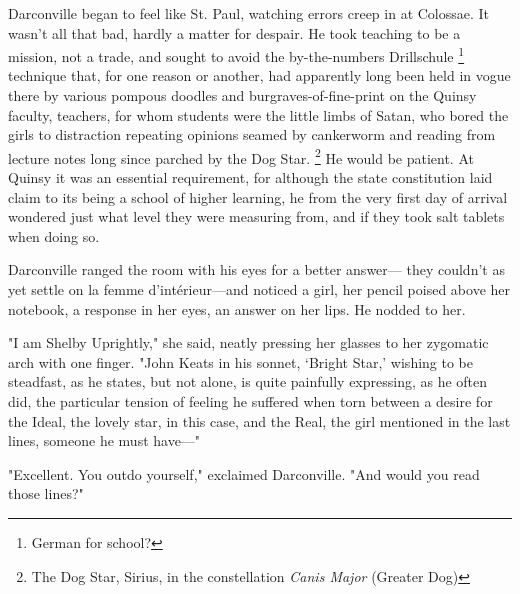  Darconville began to feel like St. Paul, watching errors creep in at Colossae.
It wasn't all that bad, hardly a matter for despair. He took teaching to be a
mission, not a trade, and sought to avoid the by-the-numbers Drillschule
\footnote{ \textdbend German for school?}
technique that, for one reason or another, had apparently long been held in
vogue there by various pompous 
doodles 
and burgraves-of-fine-print 
on the Quinsy faculty, teachers, for whom students were the little limbs of 
Satan, who bored the girls to distraction repeating opinions seamed by 
cankerworm 
and reading from lecture notes long since parched 
by the Dog Star. 
\footnote{The Dog Star, Sirius, in the constellation \textit{Canis Major}
   (Greater Dog)}
He would be patient. At Quinsy it was an essential requirement, for although 
the state constitution laid claim to its being a school of higher learning, 
he from the very first day of arrival wondered just what level they were 
measuring from, and if they took salt tablets when doing so.

  Darconville ranged the room with his eyes for a better answer--- they couldn't
as yet settle on la femme d'intérieur---and noticed a girl, her pencil poised
above her notebook, a response in her eyes, an answer on her lips. He nodded to
her.

  "I am Shelby Uprightly," she said, neatly pressing her glasses to her
zygomatic 
arch with one finger. "John Keats in his sonnet, `Bright Star,'
wishing to be steadfast, as he states, but not alone, is quite painfully
expressing, as he often did, the particular tension of feeling he suffered when
torn between a desire for the Ideal, the lovely star, in this case, and the
Real, the girl mentioned in the last lines, someone he must have---"

  "Excellent. You outdo yourself," exclaimed Darconville. "And would you read
those lines?"

